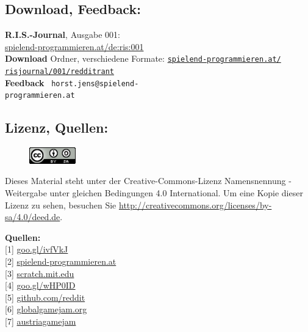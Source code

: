 \subsection*{Download, Feedback:}
\textbf{R.I.S.-Journal}, Ausgabe 001: \\
\href{http://spielend-programmieren.at/de:ris:001}{spielend-programmieren.at/de:ris:001}\\
\textbf{Download} Ordner, verschiedene Formate: \href{http://spielend-programmieren.at/risjournal/001/redditrant}{\texttt{spielend-programmieren.at/\\risjournal/001/redditrant}} \\
\textbf{Feedback} \Letter\ \texttt{horst.jens@spielend-\\programmieren.at} \\

\subsection*{Lizenz, Quellen:}
\begin{figure}
\includegraphics[width=2cm]{redditrant/ccbysa88x31.png} 
\end{figure}
Dieses Material steht unter der Creative-Commons-Lizenz Namensnennung - Weitergabe unter gleichen Bedingungen 4.0 International. Um eine Kopie dieser Lizenz zu sehen, besuchen Sie \url{http://creativecommons.org/licenses/by-sa/4.0/deed.de}.

\textbf{Quellen:} \\
{[}1{]} \href{http://www.reddit.com/r/gamedev/comments/z83h2/the_games_industry_is_a_scam_and_this_is_why_you}{goo.gl/ivfVkJ} \\
{[}2{]} \href{http://spielend-programmieren.at}{spielend-programmieren.at} \\
{[}3{]} \href{http://scratch.mit.edu/}{scratch.mit.edu} \\
{[}4{]} \href{http://spielend-programmieren.at/de:mailinglist}{goo.gl/wHP0ID} \\
{[}5{]} \href{http://github.com/reddit/}{github.com/reddit} \\
{[}6{]} \href{http://globalgamejam.org/}{globalgamejam.org} \\
{[}7{]} \href{http://austriagamejam.org/}{austriagamejam} 

